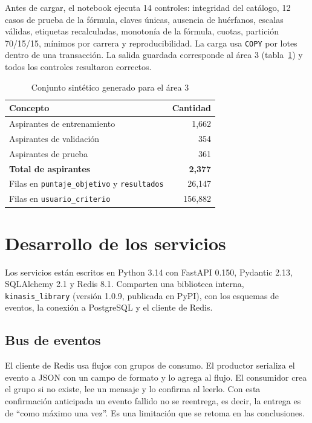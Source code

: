 Antes de cargar, el notebook ejecuta 14 controles: integridad del catálogo, 12 casos de prueba de la fórmula, claves únicas, ausencia de huérfanos, escalas válidas, etiquetas recalculadas, monotonía de la fórmula, cuotas, partición 70/15/15, mínimos por carrera y reproducibilidad. La carga usa \texttt{COPY} por lotes dentro de una transacción. La salida guardada corresponde al área 3 (tabla~\ref{tab:dataset-area3}) y todos los controles resultaron correctos.

\begin{table}[H]
\centering
\small
\renewcommand{\arraystretch}{1.2}
\caption{Conjunto sintético generado para el área 3}
\label{tab:dataset-area3}
\begin{tabular}{lr}
\toprule
\rowcolor{encabezadoTabla} \color{white}\textbf{Concepto} & \color{white}\textbf{Cantidad} \\
\midrule
Aspirantes de entrenamiento & 1,662 \\
\rowcolor{filaAlterna}
Aspirantes de validación & 354 \\
Aspirantes de prueba & 361 \\
\rowcolor{filaAlterna}
\textbf{Total de aspirantes} & \textbf{2,377} \\
Filas en \texttt{puntaje\_objetivo} y \texttt{resultados} & 26,147 \\
\rowcolor{filaAlterna}
Filas en \texttt{usuario\_criterio} & 156,882 \\
\bottomrule
\end{tabular}
\end{table}

\section{Desarrollo de los servicios}
Los servicios están escritos en Python 3.14 con FastAPI 0.150, Pydantic 2.13, SQLAlchemy 2.1 y Redis 8.1. Comparten una biblioteca interna, \texttt{kinasis\_library} (versión 1.0.9, publicada en PyPI), con los esquemas de eventos, la conexión a PostgreSQL y el cliente de Redis.

\subsection{Bus de eventos}
El cliente de Redis usa flujos con grupos de consumo. El productor serializa el evento a JSON con un campo de formato y lo agrega al flujo. El consumidor crea el grupo si no existe, lee un mensaje y lo confirma al leerlo. Con esta confirmación anticipada un evento fallido no se reentrega, es decir, la entrega es de ``como máximo una vez''. Es una limitación que se retoma en las conclusiones.

